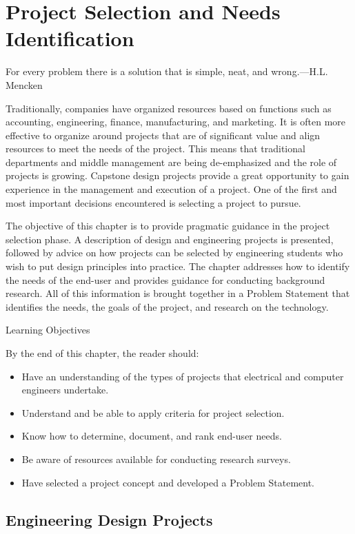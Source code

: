 \chapter{Project Selection and Needs Identification}
\graphicspath{ {./chapter02/Fig} }

For every problem there is a solution that is simple, neat, and
wrong.---H.L. Mencken

Traditionally, companies have organized resources based on functions
such as accounting, engineering, finance, manufacturing, and marketing.
It is often more effective to organize around projects that are of
significant value and align resources to meet the needs of the project.
This means that traditional departments and middle management are being
de-emphasized and the role of projects is growing. Capstone design
projects provide a great opportunity to gain experience in the
management and execution of a project. One of the first and most
important decisions encountered is selecting a project to pursue.

The objective of this chapter is to provide pragmatic guidance in the
project selection phase. A description of design and engineering
projects is presented, followed by advice on how projects can be
selected by engineering students who wish to put design principles into
practice. The chapter addresses how to identify the needs of the
end-user and provides guidance for conducting background research. All
of this information is brought together in a Problem Statement that
identifies the needs, the goals of the project, and research on the
technology.

Learning Objectives

By the end of this chapter, the reader should:

\begin{itemize}
\item
  Have an understanding of the types of projects that electrical and
  computer engineers undertake.
\item
  Understand and be able to apply criteria for project selection.
\item
  Know how to determine, document, and rank end-user needs.
\item
  Be aware of resources available for conducting research surveys.
\item
  Have selected a project concept and developed a Problem Statement.
\end{itemize}

\section{Engineering Design Projects}
\label{section:engineering-design-projects}

